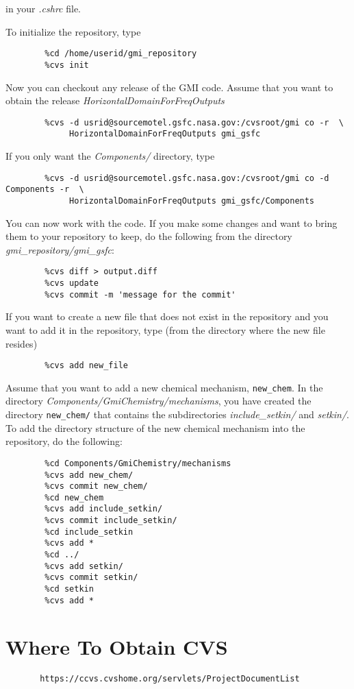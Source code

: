 in your {\em .cshrc} file.

To initialize the repository, type

\begin{verbatim}
        %cd /home/userid/gmi_repository
        %cvs init
\end{verbatim}

Now you can checkout any release of the GMI code.
Assume that you want to obtain the release 
{\em HorizontalDomainForFreqOutputs}
%
\begin{verbatim}
        %cvs -d usrid@sourcemotel.gsfc.nasa.gov:/cvsroot/gmi co -r  \
             HorizontalDomainForFreqOutputs gmi_gsfc
\end{verbatim}
%
If you only want the {\em Components/} directory, type
%
\begin{verbatim}
        %cvs -d usrid@sourcemotel.gsfc.nasa.gov:/cvsroot/gmi co -d Components -r  \
             HorizontalDomainForFreqOutputs gmi_gsfc/Components
\end{verbatim}
%
You can now work with the code.
If you make some changes and want to bring them to your repository to keep, do the
following from the directory {\em gmi\_repository/gmi\_gsfc}:
%
\begin{verbatim}
        %cvs diff > output.diff
        %cvs update
        %cvs commit -m 'message for the commit'
\end{verbatim}
%
%
If you want to create a new file that does not exist in the repository and
you want to add it in the repository, type (from the directory where the
new file resides)
%
\begin{verbatim}
        %cvs add new_file
\end{verbatim}
%
%
\begin{example}
Assume that you want to add a new chemical mechanism, {\tt new\_chem}.
In the directory {\em Components/GmiChemistry/mechanisms}, you have 
created the directory {\tt new\_chem/} that contains the subdirectories 
{\em include\_setkin/} and {\em setkin/}.
To add the directory structure of the new chemical mechanism into the
repository, do the following:
%
\begin{verbatim}
        %cd Components/GmiChemistry/mechanisms
        %cvs add new_chem/
        %cvs commit new_chem/
        %cd new_chem
        %cvs add include_setkin/
        %cvs commit include_setkin/
        %cd include_setkin
        %cvs add *
        %cd ../
        %cvs add setkin/
        %cvs commit setkin/
        %cd setkin
        %cvs add *
\end{verbatim}
%
\end{example}

\section{Where To Obtain CVS}

\begin{verbatim}
       https://ccvs.cvshome.org/servlets/ProjectDocumentList
\end{verbatim}

